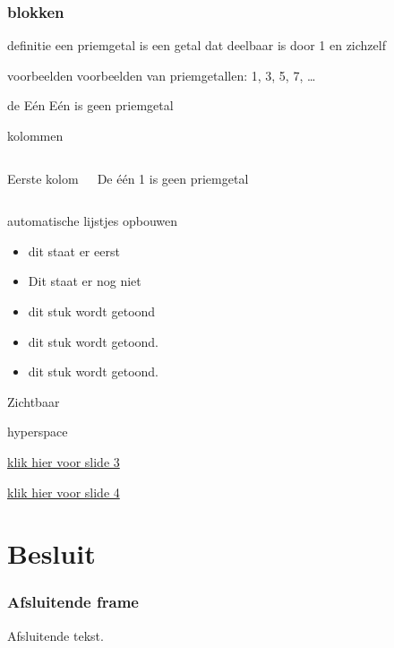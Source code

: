\documentclass[aspectratio=169,kulak,t]{kulakbeamer} %
\begin{document}
\begin{frame}
\frametitle{blokken}
\begin{block}{definitie}
een priemgetal is een getal dat deelbaar is door 1 en zichzelf
\end{block}

\begin{exampleblock}{voorbeelden}
	voorbeelden van priemgetallen: 1, 3, 5, 7, \ldots
\end{exampleblock}

\begin{alertblock}{de Eén}
	Eén is geen priemgetal
\end{alertblock}


	
\end{frame}

\begin{frame}{kolommen}
	\begin{columns}
		
		Eerste kolom
	\begin{alertblock}{De één}
		1 is geen priemgetal
	\end{alertblock}

	\end{columns}
\end{frame}	
\begin{frame}{automatische lijstjes opbouwen}
	\begin{itemize}[<+->]
		\item dit staat er eerst
		\item Dit staat er \alert{nog} niet
		\item dit stuk wordt  getoond
		\item dit stuk wordt  getoond.
		\item dit stuk wordt  getoond.
	\end{itemize}
\hypertarget<3>{auto:3}{Zichtbaar}
\hypertarget<4>{auto:4}{}
\end{frame}	

\begin{frame}{hyperspace}

\hyperlink{auto:3}{klik hier voor slide 3}

\hyperlink{auto:4}{klik hier voor slide 4}

\end{frame}
\section{Besluit}
\begin{frame}
\frametitle{Afsluitende frame}
Afsluitende tekst.
\end{frame}
\end{document}
